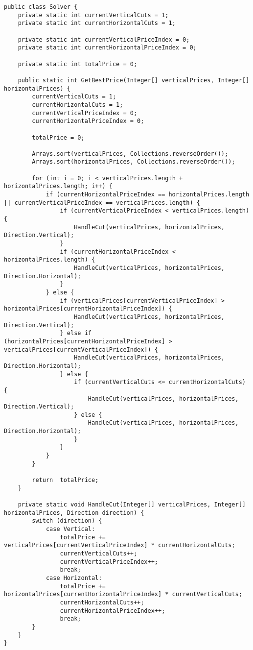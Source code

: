 \documentclass[11pt]{article}
\begin{document}
\begin{lstlisting}[caption=Algorithme de résolution du problème, label={lst:algo}]
public class Solver {
    private static int currentVerticalCuts = 1;
    private static int currentHorizontalCuts = 1;

    private static int currentVerticalPriceIndex = 0;
    private static int currentHorizontalPriceIndex = 0;

    private static int totalPrice = 0;

    public static int GetBestPrice(Integer[] verticalPrices, Integer[] horizontalPrices) {
        currentVerticalCuts = 1;
        currentHorizontalCuts = 1;
        currentVerticalPriceIndex = 0;
        currentHorizontalPriceIndex = 0;

        totalPrice = 0;

        Arrays.sort(verticalPrices, Collections.reverseOrder());
        Arrays.sort(horizontalPrices, Collections.reverseOrder());

        for (int i = 0; i < verticalPrices.length + horizontalPrices.length; i++) {
            if (currentHorizontalPriceIndex == horizontalPrices.length || currentVerticalPriceIndex == verticalPrices.length) {
                if (currentVerticalPriceIndex < verticalPrices.length) {
                    HandleCut(verticalPrices, horizontalPrices, Direction.Vertical);
                }
                if (currentHorizontalPriceIndex < horizontalPrices.length) {
                    HandleCut(verticalPrices, horizontalPrices, Direction.Horizontal);
                }
            } else {
                if (verticalPrices[currentVerticalPriceIndex] > horizontalPrices[currentHorizontalPriceIndex]) {
                    HandleCut(verticalPrices, horizontalPrices, Direction.Vertical);
                } else if (horizontalPrices[currentHorizontalPriceIndex] > verticalPrices[currentVerticalPriceIndex]) {
                    HandleCut(verticalPrices, horizontalPrices, Direction.Horizontal);
                } else {
                    if (currentVerticalCuts <= currentHorizontalCuts) {
                        HandleCut(verticalPrices, horizontalPrices, Direction.Vertical);
                    } else {
                        HandleCut(verticalPrices, horizontalPrices, Direction.Horizontal);
                    }
                }
            }
        }

        return  totalPrice;
    }

    private static void HandleCut(Integer[] verticalPrices, Integer[] horizontalPrices, Direction direction) {
        switch (direction) {
            case Vertical:
                totalPrice += verticalPrices[currentVerticalPriceIndex] * currentHorizontalCuts;
                currentVerticalCuts++;
                currentVerticalPriceIndex++;
                break;
            case Horizontal:
                totalPrice += horizontalPrices[currentHorizontalPriceIndex] * currentVerticalCuts;
                currentHorizontalCuts++;
                currentHorizontalPriceIndex++;
                break;
        }
    }
}
\end{lstlisting}
\end{document}
